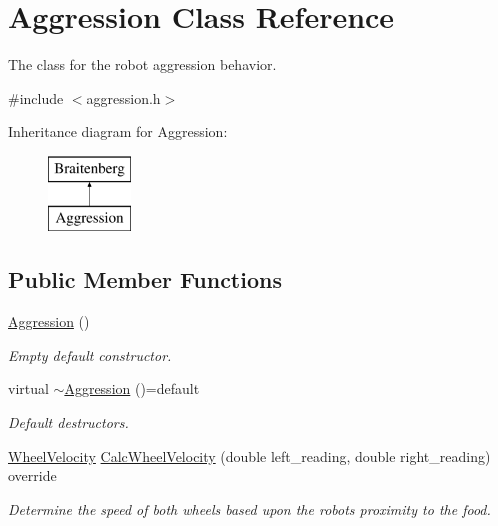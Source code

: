 \hypertarget{class_aggression}{}\section{Aggression Class Reference}
\label{class_aggression}


The class for the robot aggression behavior.  




{\ttfamily \#include $<$aggression.\+h$>$}

Inheritance diagram for Aggression\+:\begin{figure}[H]
\begin{center}
\leavevmode
\includegraphics[height=2.000000cm]{class_aggression}
\end{center}
\end{figure}
\subsection*{Public Member Functions}
\begin{DoxyCompactItemize}
\item 
\mbox{\label{class_aggression_adcab01129d24dc528ecbe51f474facc6}} 
\mbox{\hyperlink{class_aggression_adcab01129d24dc528ecbe51f474facc6}{Aggression}} ()
\begin{DoxyCompactList}\small\item\em Empty default constructor. \end{DoxyCompactList}\item 
\mbox{\label{class_aggression_ac9851ee6b8615085c2d7235dce97e4b6}} 
virtual \mbox{\hyperlink{class_aggression_ac9851ee6b8615085c2d7235dce97e4b6}{$\sim$\+Aggression}} ()=default
\begin{DoxyCompactList}\small\item\em Default destructors. \end{DoxyCompactList}\item 
\mbox{\hyperlink{struct_wheel_velocity}{Wheel\+Velocity}} \mbox{\hyperlink{class_aggression_ac1d60760573a45bfa025c08f33c5fe96}{Calc\+Wheel\+Velocity}} (double left\+\_\+reading, double right\+\_\+reading) override
\begin{DoxyCompactList}\small\item\em Determine the speed of both wheels based upon the robots proximity to the food. \end{DoxyCompactList}\end{DoxyCompactItemize}


